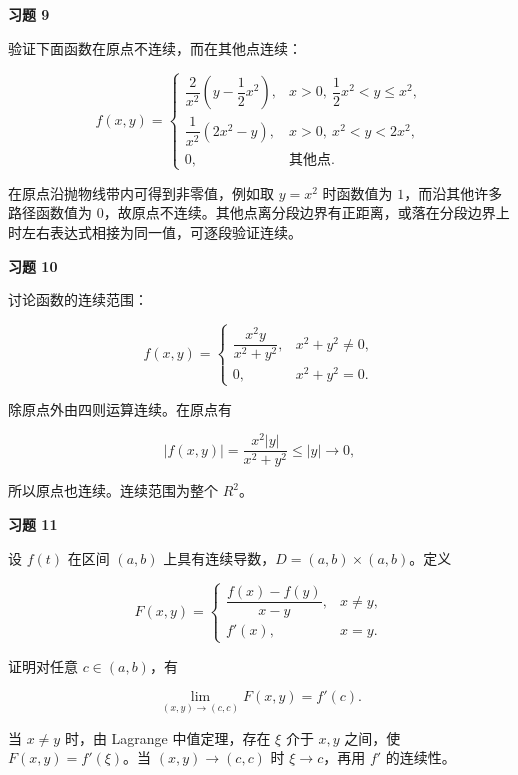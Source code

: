 \begin{exercisebox}
\textbf{习题 9}

验证下面函数在原点不连续，而在其他点连续：

\[
      f(x,y)=
      \begin{cases}
      \dfrac{2}{x^2}\left(y-\dfrac12x^2\right),&x>0,\ \dfrac12x^2< y\le x^2,\\[6pt]
      \dfrac{1}{x^2}(2x^2-y),&x>0,\ x^2< y<2x^2,\\[6pt]
      0,&\text{其他点}.
      \end{cases}
      \]

\begin{hintbox}
在原点沿抛物线带内可得到非零值，例如取 \(y=x^2\) 时函数值为 \(1\)，而沿其他许多路径函数值为 \(0\)，故原点不连续。其他点离分段边界有正距离，或落在分段边界上时左右表达式相接为同一值，可逐段验证连续。
\end{hintbox}
\end{exercisebox}

\begin{exercisebox}
\textbf{习题 10}

讨论函数的连续范围：

\[
      f(x,y)=
      \begin{cases}
      \dfrac{x^2y}{x^2+y^2},&x^2+y^2\ne0,\\
      0,&x^2+y^2=0.
      \end{cases}
      \]

\begin{hintbox}
除原点外由四则运算连续。在原点有

\[
          |f(x,y)|=\frac{x^2|y|}{x^2+y^2}\le |y|\to0,
        \]

所以原点也连续。连续范围为整个 \(R^2\)。
\end{hintbox}
\end{exercisebox}

\begin{exercisebox}
\textbf{习题 11}

设 \(f(t)\) 在区间 \((a,b)\) 上具有连续导数，\(D=(a,b)\times(a,b)\)。定义

\[
      F(x,y)=
      \begin{cases}
      \dfrac{f(x)-f(y)}{x-y},&x\ne y,\\
      f'(x),&x=y.
      \end{cases}
      \]

证明对任意 \(c\in(a,b)\)，有

\[
        \lim_{(x,y)\to(c,c)}F(x,y)=f'(c).
      \]

\begin{hintbox}
当 \(x\ne y\) 时，由 Lagrange 中值定理，存在 \(\xi\) 介于 \(x,y\) 之间，使 \(F(x,y)=f'(\xi)\)。当 \((x,y)\to(c,c)\) 时 \(\xi\to c\)，再用 \(f'\) 的连续性。
\end{hintbox}
\end{exercisebox}

